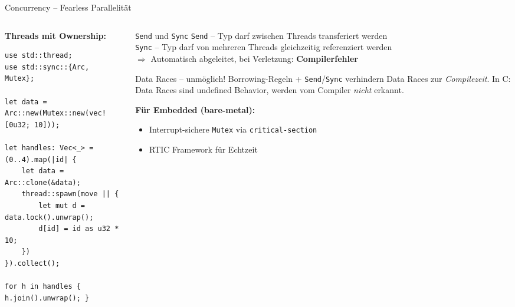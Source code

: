 \documentclass[%
  aspectratio=169,
  10pt
]{beamer}
\begin{document}
\begin{frame}[fragile]{Concurrency -- Fearless Parallelität}
  \begin{columns}[T]
    \begin{column}{0.50\textwidth}
      \textbf{Threads mit Ownership:}
\begin{lstlisting}
use std::thread;
use std::sync::{Arc, Mutex};

let data = Arc::new(Mutex::new(vec![0u32; 10]));

let handles: Vec<_> = (0..4).map(|id| {
    let data = Arc::clone(&data);
    thread::spawn(move || {
        let mut d = data.lock().unwrap();
        d[id] = id as u32 * 10;
    })
}).collect();

for h in handles { h.join().unwrap(); }
\end{lstlisting}
    \end{column}
    \begin{column}{0.47\textwidth}
      \begin{block}{\texttt{Send} und \texttt{Sync}}
        \small
        \texttt{Send} -- Typ darf zwischen Threads
        transferiert werden\\[0.2em]
        \texttt{Sync} -- Typ darf von mehreren Threads
        gleichzeitig referenziert werden\\[0.2em]
        $\Rightarrow$ Automatisch abgeleitet, bei Verletzung:
        \textbf{Compilerfehler}
      \end{block}
      \begin{alertblock}{Data Races -- unmöglich!}
        \small Borrowing-Regeln + \texttt{Send}/\texttt{Sync}
        verhindern Data Races zur \emph{Compilezeit}.
        In C: Data Races sind undefined Behavior,
        werden vom Compiler \emph{nicht} erkannt.
      \end{alertblock}
      \textbf{Für Embedded (bare-metal):}
      \small
      \begin{itemize}
        \item Interrupt-sichere \texttt{Mutex} via
              \texttt{critical-section}
        \item RTIC Framework für Echtzeit
      \end{itemize}
    \end{column}
  \end{columns}
\end{frame}
\end{document}
